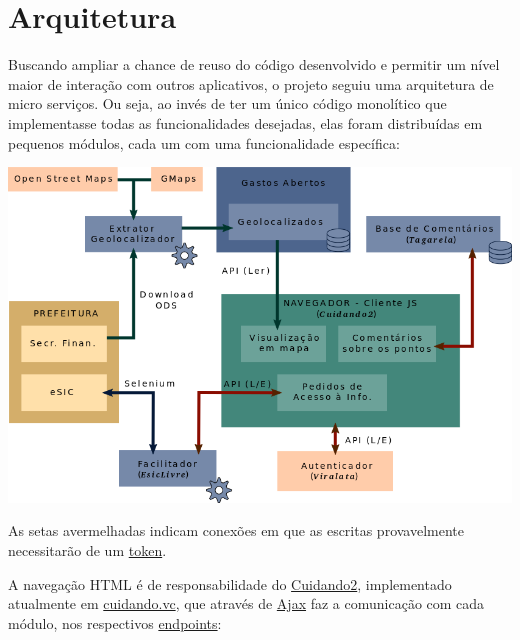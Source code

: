 \documentclass[letterpaper,10pt,brazil]{sphinxmanual}
\begin{document}
\chapter{Arquitetura}
\label{index:arquitetura}
Buscando ampliar a chance de reuso do código desenvolvido e permitir um nível
maior de interação com outros aplicativos, o projeto seguiu uma arquitetura de
micro serviços. Ou seja, ao invés de ter um único código monolítico que
implementasse todas as funcionalidades desejadas, elas foram distribuídas em
pequenos módulos, cada um com uma funcionalidade específica:

\includegraphics{cuidando2_arq2-827px.png}

As setas avermelhadas indicam conexões em que as escritas provavelmente
necessitarão de um
\href{https://github.com/okfn-brasil/viralata\#protocol}{token}.

A navegação HTML é de responsabilidade do \href{https://github.com/okfn-brasil/cuidando2}{Cuidando2}, implementado
atualmente em \href{https://cuidando.vc}{cuidando.vc}, que através de
\href{https://en.wikipedia.org/wiki/Ajax\_(programming)}{Ajax} faz a
comunicação com cada módulo, nos respectivos
\href{http://www.w3.org/TR/wsdl20/\#Endpoint}{endpoints}:
\end{document}
